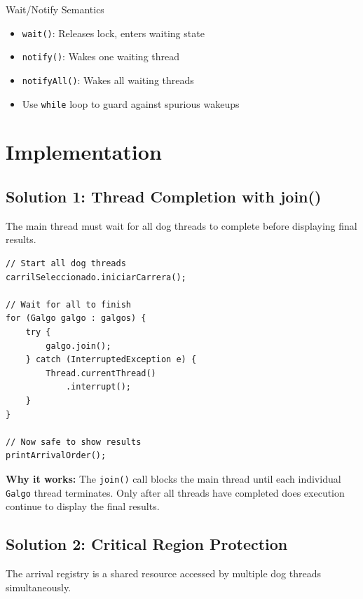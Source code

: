 \documentclass[10pt,a4paper,twocolumn]{article}
\begin{document}
\begin{conceptbox}{Wait/Notify Semantics}
\begin{itemize}
    \item \texttt{wait()}: Releases lock, enters waiting state
    \item \texttt{notify()}: Wakes one waiting thread
    \item \texttt{notifyAll()}: Wakes all waiting threads
    \item Use \texttt{while} loop to guard against spurious wakeups
\end{itemize}
\end{conceptbox}

\section{Implementation}

\subsection{Solution 1: Thread Completion with join()}

The main thread must wait for all dog threads to complete before displaying final results.

\begin{lstlisting}[caption={MainCanodromo.java - join() Implementation}]
// Start all dog threads
carrilSeleccionado.iniciarCarrera();

// Wait for all to finish
for (Galgo galgo : galgos) {
    try {
        galgo.join();
    } catch (InterruptedException e) {
        Thread.currentThread()
            .interrupt();
    }
}

// Now safe to show results
printArrivalOrder();
\end{lstlisting}

\textbf{Why it works:} The \texttt{join()} call blocks the main thread until each individual \texttt{Galgo} thread terminates. Only after all threads have completed does execution continue to display the final results.

\subsection{Solution 2: Critical Region Protection}

The arrival registry is a shared resource accessed by multiple dog threads simultaneously.
\end{document}
